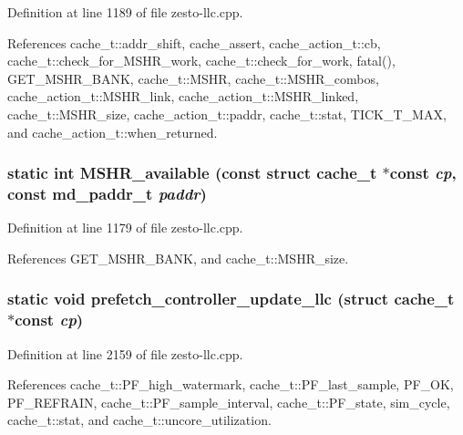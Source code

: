 Definition at line 1189 of file zesto-llc.cpp.

References cache\_\-t::addr\_\-shift, cache\_\-assert, cache\_\-action\_\-t::cb, cache\_\-t::check\_\-for\_\-MSHR\_\-work, cache\_\-t::check\_\-for\_\-work, fatal(), GET\_\-MSHR\_\-BANK, cache\_\-t::MSHR, cache\_\-t::MSHR\_\-combos, cache\_\-action\_\-t::MSHR\_\-link, cache\_\-action\_\-t::MSHR\_\-linked, cache\_\-t::MSHR\_\-size, cache\_\-action\_\-t::paddr, cache\_\-t::stat, TICK\_\-T\_\-MAX, and cache\_\-action\_\-t::when\_\-returned.
\subsubsection[{MSHR\_\-available}]{\setlength{\rightskip}{0pt plus 5cm}static int MSHR\_\-available (const struct {\bf cache\_\-t} $\ast$const  {\em cp}, \/  const {\bf md\_\-paddr\_\-t} {\em paddr})\hspace{0.3cm}{\tt  [inline, static]}}\label{zesto-llc_8cpp_eb1b85c3ab5d1ac1520577d21fd09dee}




Definition at line 1179 of file zesto-llc.cpp.

References GET\_\-MSHR\_\-BANK, and cache\_\-t::MSHR\_\-size.
\subsubsection[{prefetch\_\-controller\_\-update\_\-llc}]{\setlength{\rightskip}{0pt plus 5cm}static void prefetch\_\-controller\_\-update\_\-llc (struct {\bf cache\_\-t} $\ast$const  {\em cp})\hspace{0.3cm}{\tt  [static]}}\label{zesto-llc_8cpp_2a67725e0ce33f38cea945ca6beef7d7}




Definition at line 2159 of file zesto-llc.cpp.

References cache\_\-t::PF\_\-high\_\-watermark, cache\_\-t::PF\_\-last\_\-sample, PF\_\-OK, PF\_\-REFRAIN, cache\_\-t::PF\_\-sample\_\-interval, cache\_\-t::PF\_\-state, sim\_\-cycle, cache\_\-t::stat, and cache\_\-t::uncore\_\-utilization.

